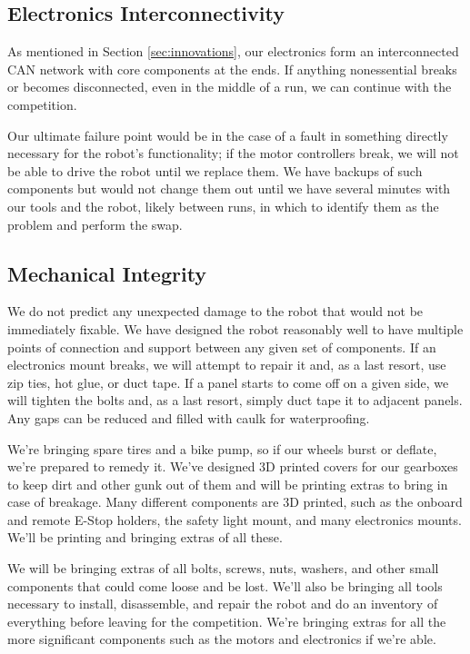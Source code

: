 \subsection{Electronics Interconnectivity}

As mentioned in Section \ref{sec:innovations}, our electronics form an interconnected CAN network with core components at the ends. If anything nonessential breaks or becomes disconnected, even in the middle of a run, we can continue with the competition.

Our ultimate failure point would be in the case of a fault in something directly necessary for the robot's functionality; if the motor controllers break, we will not be able to drive the robot until we replace them. We have backups of such components but would not change them out until we have several minutes with our tools and the robot, likely between runs, in which to identify them as the problem and perform the swap.

\subsection{Mechanical Integrity}

We do not predict any unexpected damage to the robot that would not be immediately fixable. We have designed the robot reasonably well to have multiple points of connection and support between any given set of components. If an electronics mount breaks, we will attempt to repair it and, as a last resort, use zip ties, hot glue, or duct tape. If a panel starts to come off on a given side, we will tighten the bolts and, as a last resort, simply duct tape it to adjacent panels. Any gaps can be reduced and filled with caulk for waterproofing.

We're bringing spare tires and a bike pump, so if our wheels burst or deflate, we're prepared to remedy it. We've designed 3D printed covers for our gearboxes to keep dirt and other gunk out of them and will be printing extras to bring in case of breakage. Many different components are 3D printed, such as the onboard and remote E-Stop holders, the safety light mount, and many electronics mounts. We'll be printing and bringing extras of all these.

We will be bringing extras of all bolts, screws, nuts, washers, and other small components that could come loose and be lost. We'll also be bringing all tools necessary to install, disassemble, and repair the robot and do an inventory of everything before leaving for the competition. We're bringing extras for all the more significant components such as the motors and electronics if we're able. 

